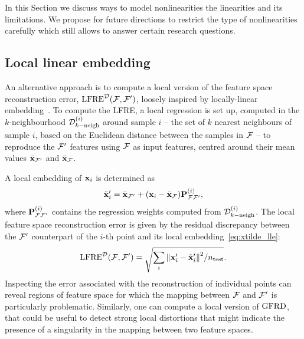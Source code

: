 In this Section we discuss ways to model nonlinearities the linearities and its limitations.
We propose for future directions to restrict the type of nonlinearities carefully which still allows to answer certain research questions.

\subsection{Local linear embedding}
An alternative approach is to compute a local version of the feature space reconstruction error, $\operatorname{LFRE}^{\mathcal{D}}(\mathcal{F},\mathcal{F}^\prime)$, loosely inspired by locally-linear embedding~\cite{rowe-saul00science}. 
To compute the LFRE, a local regression is set up, computed in the $k$-neighbourhood $\mathcal{D}_{k-\text{neigh}}^{(i)}$ around sample $i$  -- the set of $k$ nearest neighbours of sample $i$, based on the Euclidean distance between the samples in $\mathcal{F}$ -- to reproduce the $\mathcal{F}^\prime$ features using $\mathcal{F}$ as input features, centred around their mean values $\bar{\mathbf{x}}_{\mathcal{F}^\prime}$ and $\bar{\mathbf{x}}_{\mathcal{F}}$.


A local embedding of $\mathbf{x}_i$ is determined as
\begin{equation}
\tilde{\mathbf{x}}^\prime_i = \bar{\mathbf{x}}_{\mathcal{F}^\prime} + (\mathbf{x}_i - \bar{\mathbf{x}}_{\mathcal{F}})\mathbf{P}_{{\mathcal{F}}{\mathcal{F}^\prime}}^{(i)},\label{eq:xtilde_lle}
\end{equation}
where $\mathbf{P}_{{\mathcal{F}}{\mathcal{F}'}}^{(i)}$ contains the regression weights computed from $\mathcal{D}_{k-\text{neigh}}^{(i)}$.
The local feature space reconstruction error is given by the residual discrepancy between the $\mathcal{F}^\prime$ counterpart of the $i$-th point and its local embedding~\eqref{eq:xtilde_lle}:
\begin{equation}
\operatorname{LFRE}^{\mathcal{D}}(\mathcal{F},\mathcal{F}^\prime) = \sqrt{\sum_i \norm{\mathbf{x}^\prime_i - \tilde{\mathbf{x}}^\prime_i}^2/{n_{\mathrm{test}}}}.
\label{eq:LFRE}
\end{equation}
Inspecting the error associated with the reconstruction of individual points can reveal regions of feature space for which the mapping between $\mathcal{F}$  and $\mathcal{F}^\prime$ is particularly problematic. 
Similarly, one can compute a local version of $\operatorname{GFRD}$, that could be useful to detect strong local distortions that might indicate the presence of a singularity in the mapping between two feature spaces.


